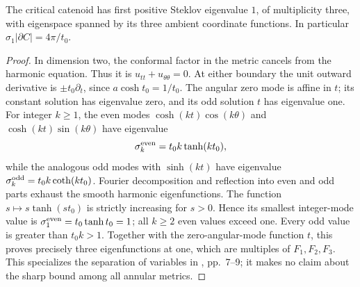 \begin{proposition}\label{prop:critical-catenoid-steklov}
The critical catenoid has first positive Steklov eigenvalue $1$, of multiplicity three, with eigenspace spanned by its three ambient coordinate functions. In particular $\sigma_1|\partial C|=4\pi/t_0$.
\end{proposition}
\begin{proof}
In dimension two, the conformal factor in the metric cancels from the harmonic equation. Thus it is $u_{tt}+u_{\theta\theta}=0$. At either boundary the unit outward derivative is $\pm t_0\partial_t$, since $a\cosh t_0=1/t_0$. The angular zero mode is affine in $t$; its constant solution has eigenvalue zero, and its odd solution $t$ has eigenvalue one. For integer $k\geq1$, the even modes $\cosh(kt)\cos(k\theta)$ and $\cosh(kt)\sin(k\theta)$ have eigenvalue
\[
 \sigma_k^{\rm even}=t_0k\tanh(kt_0),
\]
while the analogous odd modes with $\sinh(kt)$ have eigenvalue
$\sigma_k^{\rm odd}=t_0k\coth(kt_0)$.
Fourier decomposition and reflection into even and odd parts exhaust the smooth harmonic eigenfunctions. The function $s\mapsto s\tanh(st_0)$ is strictly increasing for $s>0$. Hence its smallest integer-mode value is $\sigma_1^{\rm even}=t_0\tanh t_0=1$; all $k\geq2$ even values exceed one. Every odd value is greater than $t_0k>1$. Together with the zero-angular-mode function $t$, this proves precisely three eigenfunctions at one, which are multiples of $F_1,F_2,F_3$. This specializes the separation of variables in \cite{FS11}, pp.~7--9; it makes no claim about the sharp bound among all annular metrics.
\end{proof}
